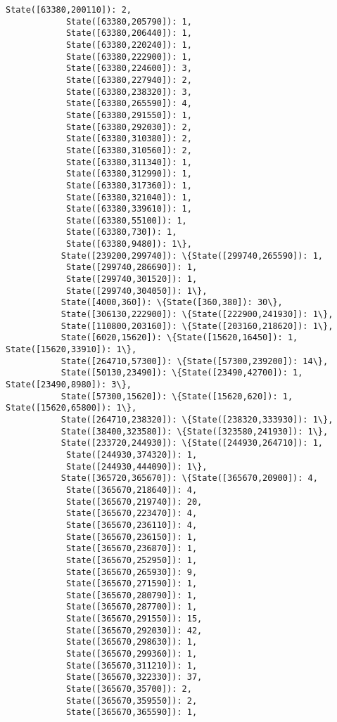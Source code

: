 \documentclass[11pt]{article}
\begin{document}
\begin{Verbatim}[commandchars=\\\{\}]
            State([63380,200110]): 2,
            State([63380,205790]): 1,
            State([63380,206440]): 1,
            State([63380,220240]): 1,
            State([63380,222900]): 1,
            State([63380,224600]): 3,
            State([63380,227940]): 2,
            State([63380,238320]): 3,
            State([63380,265590]): 4,
            State([63380,291550]): 1,
            State([63380,292030]): 2,
            State([63380,310380]): 2,
            State([63380,310560]): 2,
            State([63380,311340]): 1,
            State([63380,312990]): 1,
            State([63380,317360]): 1,
            State([63380,321040]): 1,
            State([63380,339610]): 1,
            State([63380,55100]): 1,
            State([63380,730]): 1,
            State([63380,9480]): 1\},
           State([239200,299740]): \{State([299740,265590]): 1,
            State([299740,286690]): 1,
            State([299740,301520]): 1,
            State([299740,304050]): 1\},
           State([4000,360]): \{State([360,380]): 30\},
           State([306130,222900]): \{State([222900,241930]): 1\},
           State([110800,203160]): \{State([203160,218620]): 1\},
           State([6020,15620]): \{State([15620,16450]): 1, State([15620,33910]): 1\},
           State([264710,57300]): \{State([57300,239200]): 14\},
           State([50130,23490]): \{State([23490,42700]): 1, State([23490,8980]): 3\},
           State([57300,15620]): \{State([15620,620]): 1, State([15620,65800]): 1\},
           State([264710,238320]): \{State([238320,333930]): 1\},
           State([38400,323580]): \{State([323580,241930]): 1\},
           State([233720,244930]): \{State([244930,264710]): 1,
            State([244930,374320]): 1,
            State([244930,444090]): 1\},
           State([365720,365670]): \{State([365670,20900]): 4,
            State([365670,218640]): 4,
            State([365670,219740]): 20,
            State([365670,223470]): 4,
            State([365670,236110]): 4,
            State([365670,236150]): 1,
            State([365670,236870]): 1,
            State([365670,252950]): 1,
            State([365670,265930]): 9,
            State([365670,271590]): 1,
            State([365670,280790]): 1,
            State([365670,287700]): 1,
            State([365670,291550]): 15,
            State([365670,292030]): 42,
            State([365670,298630]): 1,
            State([365670,299360]): 1,
            State([365670,311210]): 1,
            State([365670,322330]): 37,
            State([365670,35700]): 2,
            State([365670,359550]): 2,
            State([365670,365590]): 1,

\end{Verbatim}
\end{document}
